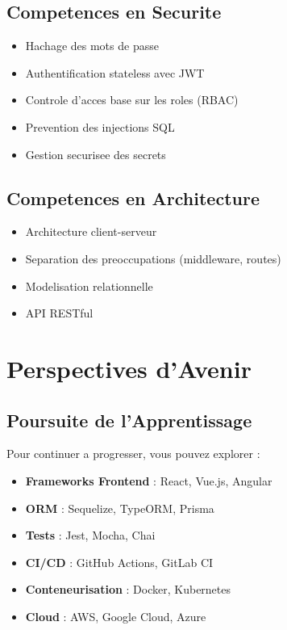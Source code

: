 \documentclass[a4paper,12pt]{book}
\begin{document}
\subsection{Competences en Securite}

\begin{itemize}
    \item Hachage des mots de passe
    \item Authentification stateless avec JWT
    \item Controle d'acces base sur les roles (RBAC)
    \item Prevention des injections SQL
    \item Gestion securisee des secrets
\end{itemize}

\subsection{Competences en Architecture}

\begin{itemize}
    \item Architecture client-serveur
    \item Separation des preoccupations (middleware, routes)
    \item Modelisation relationnelle
    \item API RESTful
\end{itemize}

\section{Perspectives d'Avenir}

\subsection{Poursuite de l'Apprentissage}

Pour continuer a progresser, vous pouvez explorer :

\begin{itemize}
    \item \textbf{Frameworks Frontend} : React, Vue.js, Angular
    \item \textbf{ORM} : Sequelize, TypeORM, Prisma
    \item \textbf{Tests} : Jest, Mocha, Chai
    \item \textbf{CI/CD} : GitHub Actions, GitLab CI
    \item \textbf{Conteneurisation} : Docker, Kubernetes
    \item \textbf{Cloud} : AWS, Google Cloud, Azure
\end{itemize}
\end{document}
